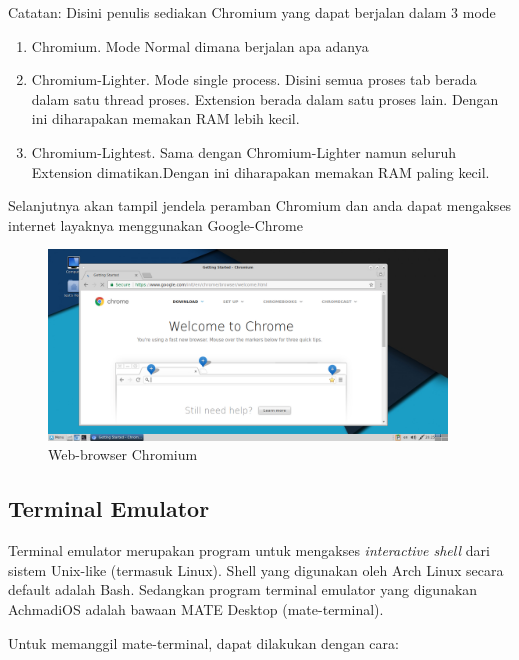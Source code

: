 \documentclass[12pt,]{article}
\begin{document}
	Catatan: Disini penulis sediakan Chromium yang dapat berjalan dalam 3 mode
	\begin{enumerate}
		\item Chromium. Mode Normal dimana berjalan apa adanya
		\item Chromium-Lighter. Mode single process. Disini semua proses tab berada dalam satu thread proses. Extension berada dalam satu proses lain. Dengan ini diharapakan memakan RAM lebih kecil.
		\item Chromium-Lightest. Sama dengan Chromium-Lighter namun seluruh Extension dimatikan.Dengan ini diharapakan memakan RAM paling kecil.
	\end{enumerate}

	Selanjutnya akan tampil jendela peramban Chromium dan anda dapat mengakses internet layaknya menggunakan Google-Chrome
	\begin{figure}[h]
		\centering
		\includegraphics[width=300pt]{png/chromium}
		\caption{Web-browser Chromium}
	\end{figure}

	\newpage
	\subsection{Terminal Emulator}
	
	Terminal emulator merupakan program untuk mengakses \textit{interactive shell} dari sistem Unix-like (termasuk Linux).
	Shell yang digunakan oleh Arch Linux secara default adalah Bash.
	Sedangkan program terminal emulator yang digunakan AchmadiOS adalah bawaan MATE Desktop (mate-terminal). 
	
	Untuk memanggil mate-terminal, dapat dilakukan dengan cara:
	
\end{document}
